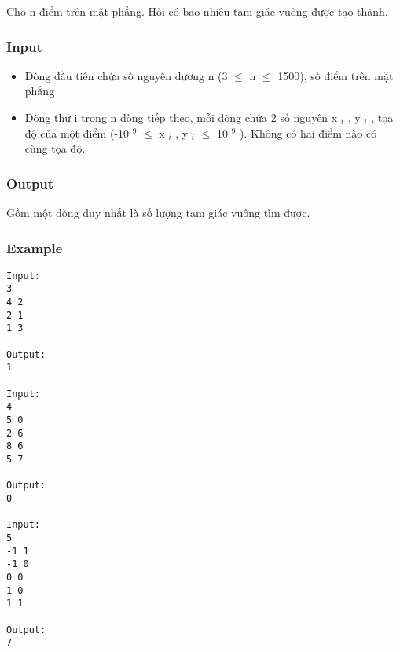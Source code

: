 



   Cho n điểm trên mặt phẳng. Hỏi có bao nhiêu tam giác vuông được tạo thành.  

\subsubsection{   Input  }
\begin{itemize}
	\item     Dòng đầu tiên chứa số nguyên dương n (3 $\le$ n $\le$ 1500), số điểm trên mặt phẳng   
	\item     Dòng thứ i trong n dòng tiếp theo, mỗi dòng chứa 2 số nguyên x    $_     i    $    , y    $_     i    $    , tọa độ của một điểm (-10    $^     9    $     $\le$ x    $_     i    $    , y    $_     i    $     $\le$  10    $^     9    $    ). Không có hai điểm nào có cùng tọa độ.   
\end{itemize}

\subsubsection{   Output  }

   Gồm một dòng duy nhất là số lượng tam giác vuông tìm được.  

\subsubsection{   Example  }
\begin{verbatim}
Input:
3
4 2
2 1
1 3

Output:
1

Input:
4
5 0
2 6
8 6
5 7

Output:
0

Input:
5
-1 1
-1 0
0 0
1 0
1 1

Output:
7
\end{verbatim}
